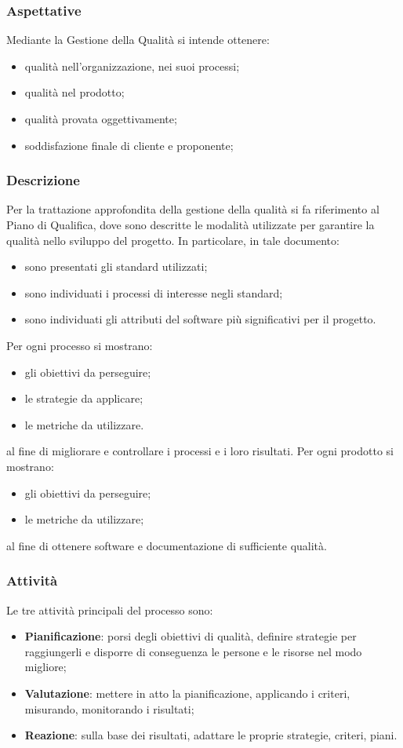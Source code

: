 	\subsubsection{Aspettative}
	Mediante la Gestione della Qualità si intende ottenere:
	\begin{itemize}
		\item qualità nell'organizzazione, nei suoi processi;
		\item qualità nel prodotto;
		\item qualità provata oggettivamente;
		\item soddisfazione finale di cliente e proponente;
	\end{itemize}
	\subsubsection{Descrizione}
	Per la trattazione approfondita della gestione della qualità si fa riferimento al Piano di Qualifica, dove sono descritte le modalità utilizzate per garantire la qualità nello sviluppo del progetto. In particolare, in tale documento:
	\begin{itemize}
		\item sono presentati gli standard utilizzati;
		\item sono individuati i processi di interesse negli standard;
		\item sono individuati gli attributi del software più significativi per il progetto.
	\end{itemize}
	Per ogni processo si mostrano:
	\begin{itemize}
		\item gli obiettivi da perseguire;
		\item le strategie da applicare;
		\item le metriche da utilizzare.
	\end{itemize}
	al fine di migliorare e controllare i processi e i loro risultati.
	Per ogni prodotto si mostrano:
	\begin{itemize}
		\item gli obiettivi da perseguire;
		\item le metriche da utilizzare;
	\end{itemize}
	al fine di ottenere software e documentazione di sufficiente qualità.
	\subsubsection{Attività}
	Le tre attività principali del processo sono:
	\begin{itemize}
		\item \textbf{Pianificazione}: porsi degli obiettivi di qualità, definire strategie per raggiungerli e disporre di conseguenza le persone e le risorse nel modo migliore;

		\item \textbf{Valutazione}: mettere in atto la pianificazione, applicando i criteri, misurando, monitorando i risultati; 
		\item \textbf{Reazione}: sulla base dei risultati, adattare le proprie strategie, criteri, piani.
	\end{itemize}

